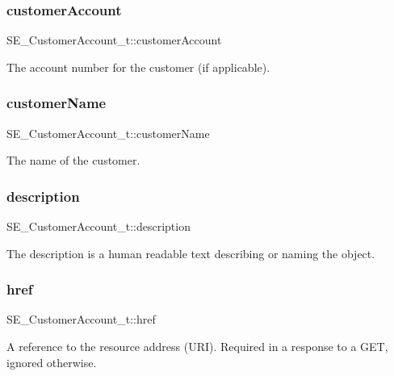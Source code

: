 \subsubsection{\texorpdfstring{customer\+Account}{customerAccount}}
{\footnotesize\ttfamily S\+E\+\_\+\+Customer\+Account\+\_\+t\+::customer\+Account}

The account number for the customer (if applicable). \mbox{\label{group__CustomerAccount_gaa057fa102ef3d9ab9c241455867a37ae}} 
\subsubsection{\texorpdfstring{customer\+Name}{customerName}}
{\footnotesize\ttfamily S\+E\+\_\+\+Customer\+Account\+\_\+t\+::customer\+Name}

The name of the customer. \mbox{\label{group__CustomerAccount_ga78f10a26490a0a66e2754e50f1c82d03}} 
\subsubsection{\texorpdfstring{description}{description}}
{\footnotesize\ttfamily S\+E\+\_\+\+Customer\+Account\+\_\+t\+::description}

The description is a human readable text describing or naming the object. \mbox{\label{group__CustomerAccount_gab1bd1ed1eeba3c50a86025c8eae89d7c}} 
\subsubsection{\texorpdfstring{href}{href}}
{\footnotesize\ttfamily S\+E\+\_\+\+Customer\+Account\+\_\+t\+::href}

A reference to the resource address (U\+RI). Required in a response to a G\+ET, ignored otherwise. \mbox{\label{group__CustomerAccount_ga082521d42ddb1a5f0726f2581b0dd79c}} 
